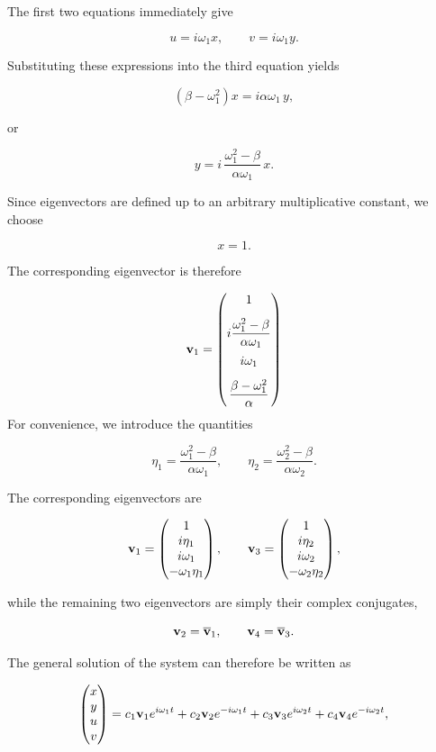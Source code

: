 \documentclass[12pt]{article}
\begin{document}
The first two equations immediately give

\[
u=i\omega_1x,
\qquad
v=i\omega_1y.
\]

Substituting these expressions into the third equation yields

\[
(\beta-\omega_1^2)x
=
i\alpha\omega_1\,y,
\]

or

\[
y
=
i\,
\frac{\omega_1^2-\beta}{\alpha\omega_1}
\,x.
\]

Since eigenvectors are defined up to an arbitrary multiplicative constant, we
choose

\[
x=1.
\]

The corresponding eigenvector is therefore

\[
 
\vb{v}_1
=
\begin{pmatrix}
1\\[0.8em]
i\dfrac{\omega_1^2-\beta}{\alpha\omega_1}\\[1.0em]
i\omega_1\\[0.8em]
\dfrac{\beta-\omega_1^2}{\alpha}
\end{pmatrix}
 
\]
For convenience, we introduce the quantities

\[
\eta_1
=
\frac{\omega_1^2-\beta}{\alpha\omega_1},
\qquad
\eta_2
=
\frac{\omega_2^2-\beta}{\alpha\omega_2}.
\]

The corresponding eigenvectors are

\[
\vb{v}_1=
\begin{pmatrix}
1\\
i\eta_1\\
i\omega_1\\
-\omega_1\eta_1
\end{pmatrix},
\qquad
\vb{v}_3=
\begin{pmatrix}
1\\
i\eta_2\\
i\omega_2\\
-\omega_2\eta_2
\end{pmatrix},
\]

while the remaining two eigenvectors are simply their complex conjugates,

\[
\vb{v}_2=\overline{\vb{v}}_1,
\qquad
\vb{v}_4=\overline{\vb{v}}_3.
\]

The general solution of the system can therefore be written as

\[
\begin{pmatrix}
x\\
y\\
u\\
v
\end{pmatrix}
=
c_1\vb{v}_1e^{i\omega_1t}
+
c_2\vb{v}_2e^{-i\omega_1t}
+
c_3\vb{v}_3e^{i\omega_2t}
+
c_4\vb{v}_4e^{-i\omega_2t},
\]
\end{document}
